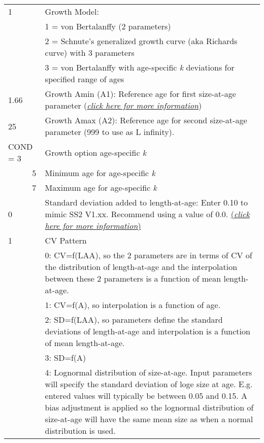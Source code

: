 \begin{center}
\begin{longtable}{p{0.5cm} p{2cm} p{12cm}}
	   \pagebreak

	   1 & & Growth Model: \\
	     & & 1 = von Bertalanffy (2 parameters)\\
	     & & 2 = Schnute's generalized growth curve (aka Richards curve) with 3 parameters \\
	     & & 3 = von Bertalanffy with age-specific \textit{k} deviations for specified range of ages\\
	   \hline

	   1.66 & & Growth Amin (A1): Reference age for first size-at-age parameter (\hyperlink{A1}{\textit{click here for more information}})\\
	   \hline

	   25 & & Growth Amax (A2): Reference age for second size-at-age parameter (999 to use as L infinity).\\
	   \hline

	   \multicolumn{2}{l}{COND = 3} & Growth option age-specific \textit{k}\\
	   & 5 & Minimum age for age-specific \textit{k}\\
	   & 7 & Maximum age for age-specific \textit{k}\\
	   \hline

	   0 & & Standard deviation added to length-at-age: Enter 0.10 to mimic SS2 V1.xx. Recommend using a value of 0.0.  \hyperlink{A1}{(\textit{click here for more information})}\\
	   \hline
	   1 & & CV Pattern \\
	     & & 0: CV=f(LAA), so the 2 parameters are in terms of CV of the distribution of length-at-age and the interpolation between these 2 parameters is a function of mean length-at-age.\\
	     & & 1: CV=f(A), so interpolation is a function of age.\\
	     & & 2: SD=f(LAA), so parameters define the standard deviations of length-at-age and interpolation is a function of mean length-at-age.\\
	     & & 3: SD=f(A) \\
	     & & 4: Lognormal distribution of size-at-age.  Input parameters will specify the standard deviation of loge size at age.  E.g. entered values will typically be between 0.05 and 0.15.  A bias adjustment is applied so the lognormal distribution of size-at-age will have the same mean size as when a normal distribution is used.\\
	   \hline


\end{longtable}
\end{center}
